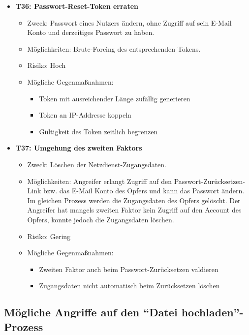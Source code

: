 \documentclass[12pt,DIV14,BCOR10mm,a4paper,parskip=half-,headsepline,headinclude,english,ngerman,bibliography=totocnumbered]{scrreprt}
\begin{document}
\begin{itemize}

  \hypertarget{threat36}{}
  \item \textbf{T36: Passwort-Reset-Token erraten}
  \begin{itemize}
  \item Zweck: Passwort eines Nutzers ändern, ohne Zugriff auf sein E-Mail Konto und derzeitiges Passwort zu haben.
  \item Möglichkeiten: Brute-Forcing des entsprechenden Tokens.
  \item Risiko: Hoch
  \item Mögliche Gegenmaßnahmen:
  \begin{itemize}
  \item Token mit ausreichender Länge zufällig generieren
  \item Token an IP-Addresse koppeln
  \item Gültigkeit des Token zeitlich begrenzen
  \end{itemize}
\end{itemize}

  \hypertarget{threat37}{}
  \item \textbf{T37: Umgehung des zweiten Faktors}
  \begin{itemize}
  \item Zweck: Löschen der Netzdienst-Zugangsdaten.
  \item Möglichkeiten: Angreifer erlangt Zugriff auf den Passwort-Zurücksetzen-Link bzw. das E-Mail Konto des Opfers und kann das Passwort ändern. Im gleichen Prozess werden die Zugangsdaten des Opfers gelöscht. Der Angreifer hat mangels zweiten Faktor kein Zugriff auf den Account des Opfers, konnte jedoch  die Zugangsdaten löschen.
  \item Risiko: Gering
  \item Mögliche Gegenmaßnahmen:
  \begin{itemize}
  	\item Zweiten Faktor auch beim Passwort-Zurücksetzen valdieren
  	\item Zugangsdaten nicht automatisch beim Zurücksetzen löschen
  \end{itemize}
\end{itemize}

\end{itemize}


\subsection{Mögliche Angriffe auf den \enquote{Datei hochladen}-Prozess}
\end{document}
